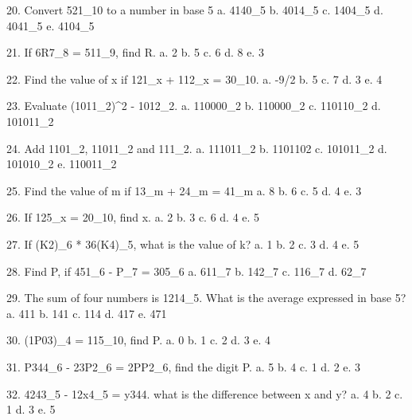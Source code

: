 20. Convert 521_10 to a number in base 5
 a. 4140_5	b. 4014_5	c. 1404_5	d. 4041_5	e. 4104_5

21. If 6R7_8 = 511_9, find R.
 a. 2	b. 5	c. 6	d. 8	e. 3

22. Find the value of x if 121_x + 112_x = 30_10.
 a. -9/2	b. 5	c. 7	d. 3	e. 4

23. Evaluate (1011_2)^2 - 1012_2. 
 a. 110000_2	b. 110000_2	c. 110110_2	d. 101011_2

24. Add 1101_2, 11011_2 and 111_2. 
 a. 111011_2	b. 1101102	c. 101011_2	d. 101010_2	e. 110011_2

25. Find the value of m if 13_m + 24_m = 41_m
 a. 8	b. 6	c. 5	d. 4	e. 3

26. If 125_x = 20_10, find x. 
 a. 2	b. 3	c. 6	d. 4	e. 5

27. If (K2)_6 * 36(K4)_5, what is the value of k? 
 a. 1	b. 2	c. 3	d. 4	e. 5

28. Find P, if 451_6 - P_7 = 305_6
 a. 611_7	b. 142_7	c. 116_7	d. 62_7

29. The sum of four numbers is 1214_5. What is the average expressed in base 5? 
 a. 411		b. 141		c. 114		d. 417		e. 471

30. (1P03)_4 = 115_10, find P. 
 a. 0	b. 1	c. 2	d. 3	e. 4

31. P344_6 - 23P2_6 = 2PP2_6, find the digit P.
 a. 5	b. 4	c. 1	d. 2	e. 3

32. 4243_5 - 12x4_5 = y344. what is the difference between x and y?
 a. 4	b. 2	c. 1	d. 3	e. 5
